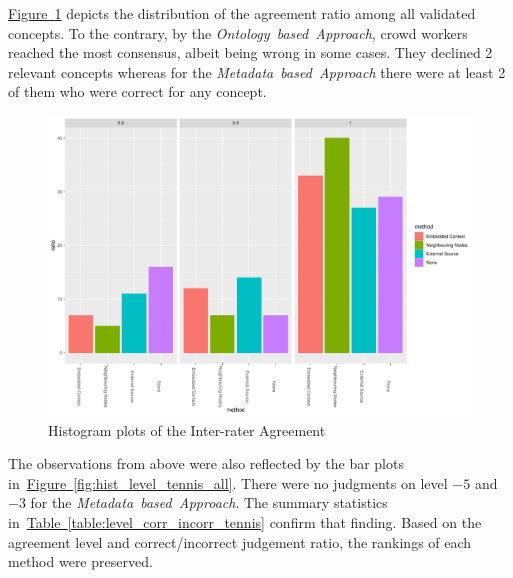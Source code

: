 \hyperref[fig:hist_agreement_tennis_all]{Figure~\ref*{fig:hist_agreement_tennis_all}} depicts the distribution of the agreement ratio among all validated concepts. To the contrary, by the \emph{Ontology~based~Approach}, crowd workers reached the most consensus, albeit being wrong in some cases. They declined 2 relevant concepts whereas for the \emph{Metadata~based~Approach} there were at least 2 of them who were correct for any concept. 
\begin{figure}
  	 \includegraphics[width=\textwidth]{plots/tennis/hist_agreement}
  	 \caption{Histogram plots of the Inter-rater Agreement}\label{fig:hist_agreement_tennis_all}
\end{figure}

The observations from above were also reflected by the bar plots in~\hyperref[fig:hist_level_tennis_all]{Figure~\ref*{fig:hist_level_tennis_all}}. 
There were no judgments on level $-5$ and $-3$ for the \emph{Metadata~based~Approach}.
The summary statistics in~\hyperref[table:level_corr_incorr_tennis]{Table~\ref*{table:level_corr_incorr_tennis}} confirm that finding. Based on the agreement level and correct/incorrect judgement ratio, the rankings of each method were preserved. 
 
